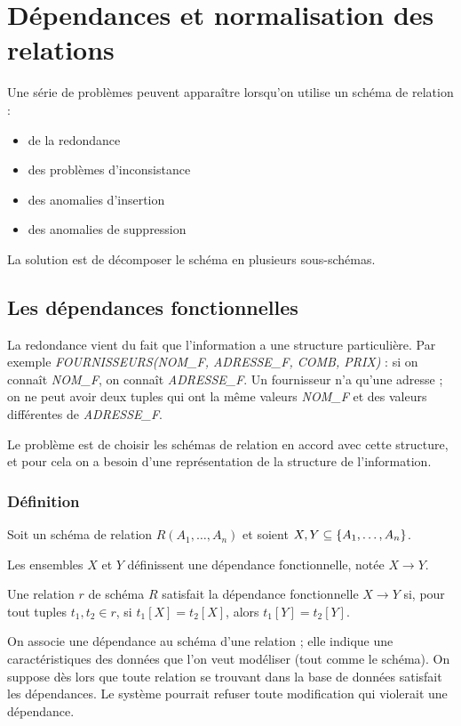\chapter{Dépendances et normalisation des relations}

Une série de problèmes peuvent apparaître lorsqu'on utilise un schéma de relation :

\begin{itemize}
	\item de la redondance
	\item des problèmes d'inconsistance
	\item des anomalies d'insertion
	\item des anomalies de suppression
\end{itemize}

La solution est de décomposer le schéma en plusieurs sous-schémas.


	\section{Les dépendances fonctionnelles}
	
	La redondance vient du fait que l'information a une structure particulière. Par exemple \textit{FOURNISSEURS(NOM\_F, ADRESSE\_F, COMB, PRIX)} : si on connaît \textit{NOM\_F}, on connaît \textit{ADRESSE\_F}.	Un fournisseur n'a qu'une adresse ; on ne peut avoir deux tuples qui ont la même valeurs \textit{NOM\_F} et des valeurs différentes de \textit{ADRESSE\_F}.
	
	Le problème est de choisir les schémas de relation en accord avec cette structure, et pour cela on a besoin d'une représentation de la structure de l'information.
	
		\subsection{Définition}
		
		Soit un schéma de relation $R(A_1, \dots , A_n)$ et soient $X, Y \subseteq \lbrace A_1, \dots , A_n \rbrace$.
		
		Les ensembles $X$ et $Y$ définissent une dépendance fonctionnelle, notée $X \rightarrow Y$.
		
		Une relation $r$ de schéma $R$ satisfait la dépendance fonctionnelle $X \rightarrow Y$ si, pour tout tuples $t_1, t_2 \in r$, si $t_1[X] = t_2[X]$, alors $t_1[Y] = t_2[Y]$.
		
		On associe une dépendance au schéma d'une relation ; elle indique une caractéristiques des données que l'on veut modéliser (tout comme le schéma). On suppose dès lors que toute relation se trouvant dans la base de données satisfait les dépendances. Le système pourrait refuser toute modification qui violerait une dépendance.
		
